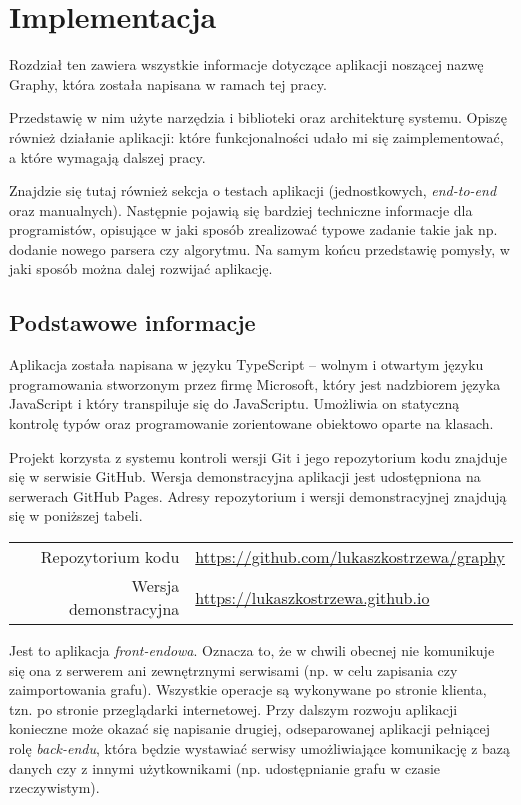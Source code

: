 \chapter{Implementacja}

Rozdział ten zawiera wszystkie informacje dotyczące aplikacji noszącej nazwę Graphy, która została napisana w ramach tej pracy. 

Przedstawię w nim użyte narzędzia i biblioteki oraz architekturę systemu. Opiszę również działanie aplikacji: które funkcjonalności udało mi się zaimplementować, a które wymagają dalszej pracy. 

Znajdzie się tutaj również sekcja o testach aplikacji (jednostkowych, \textit{end-to-end} oraz manualnych). Następnie pojawią się bardziej techniczne informacje dla programistów, opisujące w jaki sposób zrealizować typowe zadanie takie jak np. dodanie nowego parsera czy algorytmu. Na samym końcu przedstawię pomysły, w jaki sposób można dalej rozwijać aplikację.

\section{Podstawowe informacje}

Aplikacja została napisana w języku TypeScript -- wolnym i otwartym języku programowania stworzonym przez firmę Microsoft, który jest nadzbiorem języka JavaScript i który transpiluje się do JavaScriptu. Umożliwia on statyczną kontrolę typów oraz programowanie zorientowane obiektowo oparte na klasach.

Projekt korzysta z systemu kontroli wersji Git i jego repozytorium kodu znajduje się w serwisie GitHub. Wersja demonstracyjna aplikacji jest udostępniona na serwerach GitHub Pages. Adresy repozytorium i wersji demonstracyjnej znajdują się w poniższej tabeli.

\bigskip\bigskip
\noindent\begin{tabularx}{\textwidth}{r|X|}
\cline{2-2}
  Repozytorium kodu & \hyperref[https://github.com/lukaszkostrzewa/graphy]{https://github.com/lukaszkostrzewa/graphy} \\ 
\cline{2-2} 
 Wersja demonstracyjna & \hyperref[https://lukaszkostrzewa.github.io]{https://lukaszkostrzewa.github.io} \\ 
\cline{2-2}
\end{tabularx} 
\bigskip\bigskip

Jest to aplikacja \textit{front-endowa}. Oznacza to, że w chwili obecnej nie komunikuje się ona z serwerem ani zewnętrznymi serwisami (np. w celu zapisania czy zaimportowania grafu). Wszystkie operacje są wykonywane po stronie klienta, tzn. po stronie przeglądarki internetowej. Przy dalszym rozwoju aplikacji konieczne może okazać się napisanie drugiej, odseparowanej aplikacji pełniącej rolę \textit{back-endu}, która będzie wystawiać serwisy umożliwiające komunikację z bazą danych czy z innymi użytkownikami (np. udostępnianie grafu w czasie rzeczywistym).

